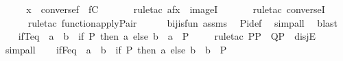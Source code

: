 \begin{isabellebody}
\isanewline
\ \ \isamarkupfalse%
\ \isamarkupfalse%
\ {\isachardoublequoteopen}x\ {\isasymin}\ converse{\isacharparenleft}{\kern0pt}f{\isacharparenright}{\kern0pt}\ {\isacharbackquote}{\kern0pt}{\isacharbackquote}{\kern0pt}\ {\isacharparenleft}{\kern0pt}f{\isacharbackquote}{\kern0pt}{\isacharbackquote}{\kern0pt}C{\isacharparenright}{\kern0pt}{\isachardoublequoteclose}\ \isanewline
\ \ \ \ \isamarkupfalse%
\ {\isacharparenleft}{\kern0pt}rule{\isacharunderscore}{\kern0pt}tac\ a{\isacharequal}{\kern0pt}{\isachardoublequoteopen}f{\isacharbackquote}{\kern0pt}x{\isachardoublequoteclose}\ \ imageI{\isacharparenright}{\kern0pt}\ \isanewline
\ \ \ \ \isamarkupfalse%
\ {\isacharparenleft}{\kern0pt}rule{\isacharunderscore}{\kern0pt}tac\ converseI{\isacharparenright}{\kern0pt}\isanewline
\ \ \ \ \isamarkupfalse%
\ {\isacharparenleft}{\kern0pt}rule{\isacharunderscore}{\kern0pt}tac\ function{\isacharunderscore}{\kern0pt}apply{\isacharunderscore}{\kern0pt}Pair{\isacharparenright}{\kern0pt}\isanewline
\ \ \ \ \isamarkupfalse%
\ bij{\isacharunderscore}{\kern0pt}is{\isacharunderscore}{\kern0pt}fun\ assms\ \isamarkupfalse%
\ Pi{\isacharunderscore}{\kern0pt}def\ \isamarkupfalse%
\ simp{\isacharunderscore}{\kern0pt}all\ \isamarkupfalse%
\ blast\ \isamarkupfalse%
\isanewline
{}\isamarkupfalse%
%
\endisatagproof
{\isafoldproof}%
%
\isadelimproof
\ \ \isanewline
%
\endisadelimproof
\isanewline
{}\isamarkupfalse%
\ ifT{\isacharunderscore}{\kern0pt}eq\ {\isacharcolon}{\kern0pt}\ {\isachardoublequoteopen}a\ {\isasymnoteq}\ b\ {\isasymLongrightarrow}\ {\isacharparenleft}{\kern0pt}if\ P\ then\ a\ else\ b{\isacharparenright}{\kern0pt}\ {\isacharequal}{\kern0pt}\ a\ {\isasymLongrightarrow}\ P{\isachardoublequoteclose}\ \isanewline
%
\isadelimproof
\ \ %
\endisadelimproof
%
\isatagproof
{}\isamarkupfalse%
\ {\isacharparenleft}{\kern0pt}rule{\isacharunderscore}{\kern0pt}tac\ P{\isacharequal}{\kern0pt}P\ \ Q{\isacharequal}{\kern0pt}{\isachardoublequoteopen}{\isasymnot}P{\isachardoublequoteclose}\ \ disjE{\isacharparenright}{\kern0pt}\ \isamarkupfalse%
\ simp{\isacharunderscore}{\kern0pt}all\ \isamarkupfalse%
%
\endisatagproof
{\isafoldproof}%
%
\isadelimproof
\ \isanewline
%
\endisadelimproof
\isanewline
{}\isamarkupfalse%
\ ifF{\isacharunderscore}{\kern0pt}eq\ {\isacharcolon}{\kern0pt}\ {\isachardoublequoteopen}a\ {\isasymnoteq}\ b\ {\isasymLongrightarrow}\ {\isacharparenleft}{\kern0pt}if\ P\ then\ a\ else\ b{\isacharparenright}{\kern0pt}\ {\isacharequal}{\kern0pt}\ b\ {\isasymLongrightarrow}\ {\isasymnot}P{\isachardoublequoteclose}\ \isanewline

\end{isabellebody}
